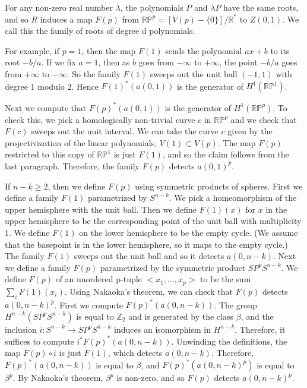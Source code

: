 \documentclass{amsart}
\newtheorem*{Theorem 1}{Theorem 1}
\newtheorem*{Theorem 2}{Theorem 2}
\newtheorem*{Theorem 1A}{Theorem 1A}
\newtheorem*{Theorem 2A}{Theorem 2A}
\newtheorem*{vanishing lemma}{Vanishing Lemma}
\numberwithin{equation}{section}
\begin{document}
For any non-zero real number $\lambda$, the polynomials $P$ and
$\lambda P$ have the same roots, and so $R$ induces a map $F(p)$
from $\mathbb{RP}^p = [V(p) - \{ 0 \} ] / \mathbb{R}^*$ to
$Z(0,1)$.  We call this the family of roots of degree d
polynomials.

For example, if $p = 1$, then the map $F(1)$ sends the
polynomial $a x + b$ to its root $-b/a$.  If we fix
$a=1$, then as $b$ goes from $- \infty$ to $+ \infty$,
the point $-b/a$ goes from $+ \infty$ to $- \infty$.  So
the family $F(1)$ sweeps out the unit ball $(-1, 1)$ with
degree 1 modulo 2.  Hence $F(1)^* (a(0,1))$ is the generator
of $H^1(\mathbb{RP}^1)$.

Next we compute that $F(p)^*(a(0,1))$ is the generator of
$H^1(\mathbb{RP}^p)$.  To check this, we pick a homologically
non-trivial curve $c$ in $\mathbb{RP}^p$ and we check that 
$F(c)$ sweeps out the unit interval.  We can take
the curve $c$ given by the projectivization of the linear
polynomials, $V(1) \subset V(p)$.  The map $F(p)$ restricted to this
copy of $\mathbb{RP}^1$ is just $F(1)$, and so the claim
follows from the last paragraph.  Therefore, the family $F(p)$ 
detects $a(0,1)^p$.

If $n-k \ge 2$, then we define $F(p)$ using symmetric products of
spheres. First we define a family $F(1)$ parametrized by
$S^{n-k}$.  We pick a homeomorphism of the upper hemisphere with
the unit ball.  Then we define $F(1)(x)$ for $x$ in the upper
hemisphere to be the corresponding point of the unit ball with
multiplicity 1.  We define $F(1)$ on the lower hemisphere to be
the empty cycle.  (We assume that the basepoint is in the lower
hemisphere, so it maps to the empty cycle.)  The family $F(1)$
sweeps out the unit ball and so it detects $a(0,n-k)$.  Next we
define a family $F(p)$ parametrized by the symmetric product
$SP^p S^{n-k}$.  We define $F(p)$ of an unordered p-tuple $< x_1,
..., x_p >$ to be the sum $\sum_i F(1)(x_i)$.  Using Nakaoka's
theorem, we can check that $F(p)$ detects $a(0,n-k)^p$.  First we
compute $F(p)^*(a(0,n-k))$. The group $H^{n-k}(SP^p S^{n-k})$ is
equal to $\mathbb{Z}_2$ and is generated by the class $\beta$,
and the inclusion $i: S^{n-k} \rightarrow SP^p S^{n-k}$ induces
an isomorphism in $H^{n-k}$.  Therefore, it suffices to compute
$i^* F(p)^* (a(0,n-k))$.  Unwinding the definitions, the map
$F(p) \circ i$ is just $F(1)$, which detects $a(0,n-k)$. 
Therefore, $F(p)^*(a(0,n-k))$ is equal to $\beta$, and
$F(p)^*(a(0,n-k)^p)$ is equal to $\beta^p$.  By Nakaoka's
theorem, $\beta^p$ is non-zero, and so $F(p)$ detects
$a(0,n-k)^p$.
\end{document}
